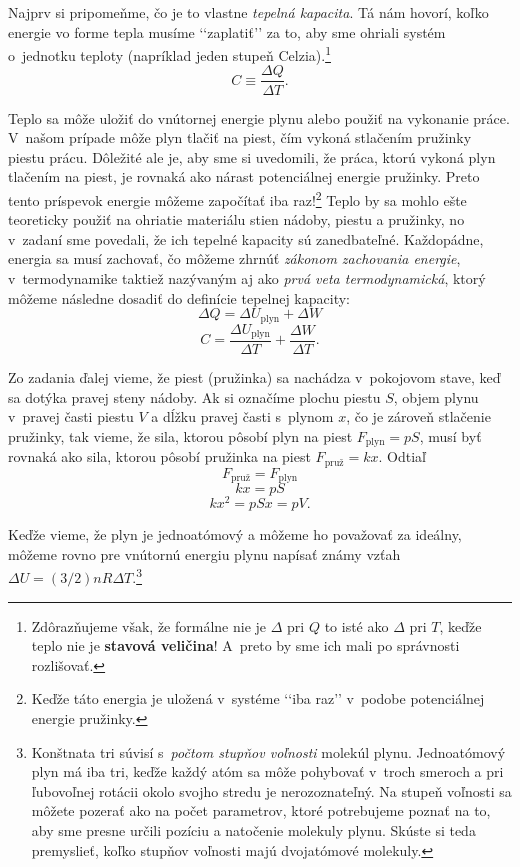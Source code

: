 Najprv si pripomeňme, čo je to vlastne \emph{tepelná kapacita}. Tá nám hovorí, koľko energie vo forme tepla musíme
\lq\lq{zaplatiť}\rq\rq{} za to, aby sme ohriali systém o~jednotku teploty (napríklad jeden stupeň Celzia).\footnote{Zdôrazňujeme však, že formálne nie je $\Delta$ pri $Q$ to isté ako $\Delta$ pri $T$, keďže teplo nie je \textbf{stavová veličina}!
A~preto by sme ich mali po správnosti rozlišovať.}
$$
  C \equiv \frac{\Delta Q}{\Delta T} \text{.}
$$

Teplo sa môže uložiť do vnútornej energie plynu alebo použiť na vykonanie práce. V~našom prípade môže plyn tlačiť na piest,
čím vykoná stlačením pružinky piestu prácu. Dôležité ale je, aby sme si uvedomili, že práca, ktorú vykoná plyn tlačením na
piest, je rovnaká ako nárast potenciálnej energie pružinky. Preto tento príspevok energie môžeme započítať iba raz!\footnote{Keďže táto energia je uložená v~systéme \lq\lq{iba raz}\rq\rq{} v~podobe potenciálnej energie pružinky.}
Teplo by sa mohlo ešte teoreticky použiť na ohriatie materiálu stien nádoby, piestu a pružinky, no v~zadaní sme povedali,
že ich tepelné kapacity sú zanedbateľné. Každopádne, energia sa musí zachovať, čo môžeme zhrnúť \emph{zákonom zachovania
energie}, v~termodynamike taktiež nazývaným aj ako \emph{prvá veta termodynamická}, ktorý môžeme následne dosadiť do definície
tepelnej kapacity:
  $$ \Delta Q = \Delta U_{\text{plyn}} + \Delta W $$
  $$C = \frac{\Delta U_{\text{plyn}}}{\Delta T} + \frac{\Delta W}{\Delta T} \text{.}$$

Zo zadania ďalej vieme, že piest (pružinka) sa nachádza v~pokojovom stave, keď sa dotýka pravej steny nádoby. Ak si označíme 
plochu piestu $S$, objem plynu v~pravej časti piestu $V$ a dĺžku pravej časti s~plynom $x$, čo je zároveň stlačenie pružinky, tak 
vieme, že sila, ktorou pôsobí plyn na piest $F_{\text{plyn}}=pS$, musí byť rovnaká ako sila, ktorou pôsobí pružinka na piest 
$F_{\text{pruž}} = kx$. Odtiaľ
$$F_{\text{pruž}} = F_{\text{plyn}}$$
$$kx = pS$$
$$kx^2 = pSx = pV\text{.}$$

Keďže vieme, že plyn je jednoatómový a môžeme ho považovať za ideálny, môžeme rovno pre vnútornú energiu plynu 
napísať známy vzťah $\Delta U = (3/2)nR\Delta T$.\footnote{Konštnata tri súvisí s~\emph{počtom stupňov voľnosti} molekúl plynu.
Jednoatómový plyn má iba tri, keďže každý atóm sa môže pohybovať v~troch smeroch a pri ľubovoľnej rotácii okolo svojho stredu
je nerozoznateľný. Na stupeň voľnosti sa môžete pozerať ako na počet parametrov, ktoré potrebujeme poznať na to, aby sme
presne určili pozíciu a natočenie molekuly plynu. Skúste si teda premyslieť, koľko stupňov voľnosti majú dvojatómové molekuly.}

